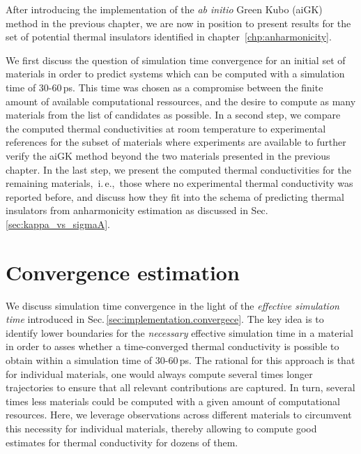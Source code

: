\label{chp:results}

After introducing the implementation of the \emph{ab initio} Green Kubo (aiGK) method in the previous chapter, we are now in position to present results for the set of potential thermal insulators identified in chapter~\ref{chp:anharmonicity}.

We first discuss the question of simulation time convergence for an initial set of materials in order to predict systems which can be computed with a simulation time of 30-60\,ps. This time was chosen as a compromise between the finite amount of available computational ressources, and the desire to compute as many materials from the list of candidates as possible.
%
In a second step, we compare the computed thermal conductivities at room temperature to experimental references for the subset of materials where experiments are available to further verify the aiGK method beyond the two materials presented in the previous chapter.
%
In the last step, we present the computed thermal conductivities for the remaining materials,~i.\,e.,~those where no experimental thermal conductivity was reported before, and discuss how they fit into the schema of predicting thermal insulators from anharmonicity estimation as discussed in Sec.\,\ref{sec:kappa_vs_sigmaA}.




\section{Convergence estimation}
We discuss simulation time convergence in the light of the \emph{effective simulation time} introduced in Sec.\,\ref{sec:implementation.convergece}. The key idea is to identify lower boundaries for the \emph{necessary} effective simulation time in a material in order to asses whether a time-converged thermal conductivity is possible to obtain within a simulation time of 30-60\,ps. The rational for this approach is that for individual materials, one would always compute several times longer trajectories to ensure that all relevant contributions are captured. In turn, several times less materials could be computed with a given amount of computational resources. Here, we leverage observations across different materials to circumvent this necessity for individual materials, thereby allowing to compute good estimates for thermal conductivity for dozens of them.

